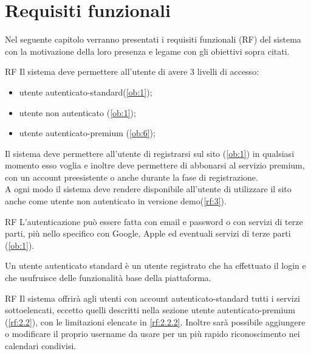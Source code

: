 \section{Requisiti funzionali}
\label{sec:RequisitiFunzionali}

Nel seguente capitolo verranno presentati i requisiti funzionali (RF) del sistema con la motivazione della loro presenza e legame con gli obiettivi sopra citati.

\begin{listaPersonale}{RF}
	 Il sistema deve permettere all'utente di avere 3 livelli di accesso:
	\begin{itemize}
		\item utente autenticato-standard(\ref{ob:1});
		\item utente non autenticato (\ref{ob:1});
		\item utente autenticato-premium (\ref{ob:6});
	\end{itemize}
	Il sistema deve permettere all'utente di registrarsi sul sito (\ref{ob:1}) in qualsiasi momento esso voglia e inoltre deve permettere di abbonarsi al servizio premium, con un account preesistente o anche durante la fase di registrazione.\\
	A ogni modo il sistema deve rendere disponibile all'utente di utilizzare il sito anche come utente non autenticato in versione demo(\ref{rf:3}).

	\begin{listaPersonale2}{RF}
		 L'autenticazione può essere fatta con email e password o con servizi di terze parti, più nello specifico con Google, Apple ed eventuali servizi di terze parti (\ref{ob:1}).
	\end{listaPersonale2}

	 Un utente autenticato standard è un utente registrato che ha effettuato il login e che usufruisce delle funzionalità base della piattaforma.

	\begin{listaPersonale2}{RF}
		 Il sistema offrirà agli utenti con account autenticato-standard tutti i servizi sottoelencati, eccetto quelli descritti nella sezione utente autenticato-premium (\ref{rf:2.2}), con le limitazioni elencate in \ref{rf:2.2.2}. Inoltre sarà possibile aggiungere o modificare il proprio username da usare per un più rapido riconoscimento nei calendari condivisi.


\end{listaPersonale2}
\end{listaPersonale}
